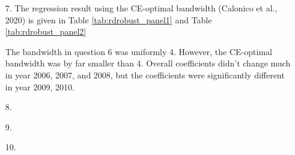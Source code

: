 \documentclass[12pt]{article}
\begin{document}
\begin{itemize}
\item[7.] The regression result using the CE-optimal bandwidth (Calonico et al., 2020) is given in Table \ref{tab:rdrobust_panel1} and Table \ref{tab:rdrobust_panel2}


The bandwidth in question 6 was uniformly 4. However, the CE-optimal bandwidth was by far smaller than 4. Overall coefficients didn't change much in year 2006, 2007, and 2008, but the coefficients were significantly different in year 2009, 2010.

\item[8.]

\item[9.]

\item[10.]



\end{itemize}
\end{document}
